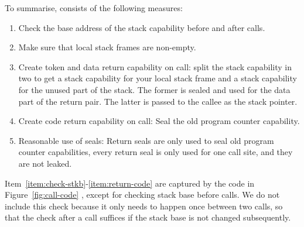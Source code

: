 \documentclass[acmsmall,screen]{acmart}\settopmatter{}
\begin{document}
To summarise, \stktokens{} consists of the following measures:
\begin{enumerate}
\item \label{item:check-stkb} Check the base address of the stack capability before and after calls.
\item \label{item:non-empty-sf} Make sure that local stack frames are non-empty.
\item \label{item:return-data} Create token and data return capability on call: split the stack capability in two to get a stack capability for your local stack frame and a stack capability for the unused part of the stack. The former is sealed and used for the data part of the return pair. The latter is passed to the callee as the stack pointer.
\item \label{item:return-code} Create code return capability on call: Seal the old program counter capability.
\item Reasonable use of seals: Return seals are only used to seal old program counter capabilities, every return seal is only used for one call site, and they are not leaked.
\end{enumerate}
Item~\ref{item:check-stkb}-\ref{item:return-code} are captured by the code in Figure~\ref{fig:call-code} , except for checking stack base before calls.
We do not include this check because it only needs to happen once between two calls, so that the check after a call suffices if the stack base is not changed subsequently.
\end{document}
